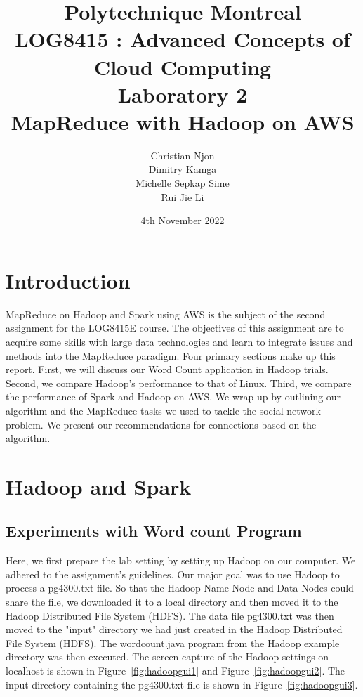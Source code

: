 \documentclass[11pt]{article}
\title{Polytechnique Montreal\\LOG8415 : Advanced Concepts of Cloud Computing\\Laboratory 2\\MapReduce with Hadoop on AWS}
\author{
    Christian Njon\\
    Dimitry Kamga\\
    Michelle Sepkap Sime\\
    Rui Jie Li
}
\date{4th November 2022}
\begin{document}
\maketitle

\maketitle

\section{Introduction}
MapReduce on Hadoop and Spark using AWS is the subject of the second assignment for the LOG8415E course. The objectives of this assignment are to acquire some skills with large data technologies and learn to integrate issues and methods into the MapReduce paradigm. Four primary sections make up this report. First, we will discuss our Word Count application in Hadoop trials. Second, we compare Hadoop's performance to that of Linux. Third, we compare the performance of Spark and Hadoop on AWS. We wrap up by outlining our algorithm and the MapReduce tasks we used to tackle the social network problem. We present our recommendations for connections based on the algorithm.

\section{Hadoop and Spark}

\subsection{Experiments with Word count Program}
Here, we first prepare the lab setting by setting up Hadoop on our computer. We adhered to the assignment's guidelines. Our major goal was to use Hadoop to process a pg4300.txt file. So that the Hadoop Name Node and Data Nodes could share the file, we downloaded it to a local directory and then moved it to the Hadoop Distributed File System (HDFS).
The data file pg4300.txt was then moved to the "input" directory we had just created in the Hadoop Distributed File System (HDFS).
The wordcount.java program from the Hadoop example directory was then executed. The screen capture of the Hadoop settings on localhost is shown in Figure~\ref{fig:hadoopgui1} and Figure~\ref{fig:hadoopgui2}. The input directory containing the pg4300.txt file is shown in Figure~\ref{fig:hadoopgui3}.
\end{document}
